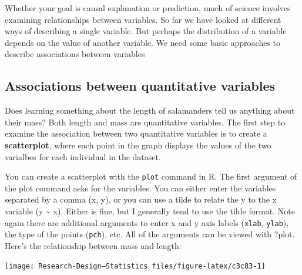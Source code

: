 \documentclass[
]{book}
\newenvironment{Shaded}{\begin{snugshade}}{\end{snugshade}}
\newcommand{\AttributeTok}[1]{\textcolor[rgb]{0.13,0.29,0.53}{#1}}
\newcommand{\CommentTok}[1]{\textcolor[rgb]{0.56,0.35,0.01}{\textit{#1}}}
\newcommand{\DecValTok}[1]{\textcolor[rgb]{0.00,0.00,0.81}{#1}}
\newcommand{\FunctionTok}[1]{\textcolor[rgb]{0.13,0.29,0.53}{\textbf{#1}}}
\newcommand{\NormalTok}[1]{#1}
\newcommand{\SpecialCharTok}[1]{\textcolor[rgb]{0.81,0.36,0.00}{\textbf{#1}}}
\newcommand{\StringTok}[1]{\textcolor[rgb]{0.31,0.60,0.02}{#1}}
\begin{document}
Whether your goal is causal explanation or prediction, much of science involves examining relationships between variables. So far we have looked at different ways of describing a single variable. But perhaps the distribution of a variable depends on the value of another variable. We need some basic approaches to describe associations between variables

\subsection{Associations between quantitative variables}\label{associations-between-quantitative-variables}

Does learning something about the length of salamanders tell us anything about their mass? Both length and mass are quantitative variables. The first step to examine the association between two quantitative variables is to create a \textbf{scatterplot}, where each point in the graph displays the values of the two varialbes for each individual in the dataset.

You can create a scatterplot with the \texttt{plot} command in R. The first argument of the plot command asks for the variables. You can either enter the variables separated by a comma (x, y), or you can use a tilde to relate the y to the x variable (y \textasciitilde{} x). Either is fine, but I generally tend to use the tilde format. Note again there are additional arguments to enter x and y axis labels (\texttt{xlab}, \texttt{ylab}), the type of the points (\texttt{pch}), etc. All of the arguments can be viewed with ?plot. Here's the relationship between mass and length:

\begin{Shaded}
\end{Shaded}

\begin{center}\texttt{[image: Research-Design---Statistics\_files/figure-latex/c3c83-1]} \end{center}
\end{document}
